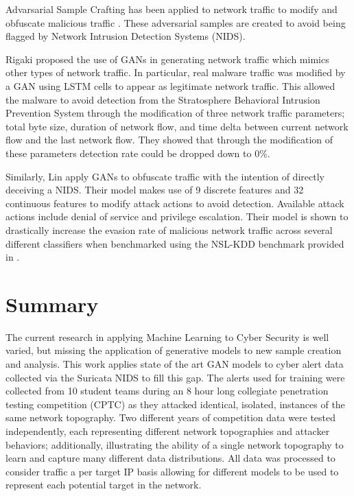 Advarsarial Sample Crafting has been applied to network traffic to modify and obfuscate malicious traffic \cite{Rigaki2018, Lin2018, Hu2017, Anderson2017}. These adversarial samples are created to avoid being flagged by Network Intrusion Detection Systems (NIDS).

Rigaki \etal \cite{Rigaki2018} proposed the use of GANs in generating network traffic which mimics other types of network traffic. In particular, real malware traffic was modified by a GAN using LSTM cells to appear as legitimate network traffic. This allowed the malware to avoid detection from the Stratosphere Behavioral Intrusion Prevention System through the modification of three network traffic parameters; total byte size, duration of network flow, and time delta between current network flow and the last network flow. They showed that through the modification of these parameters detection rate could be dropped down to 0\%. 

Similarly, Lin \etal \cite{Lin2018} apply GANs to obfuscate traffic with the intention of directly deceiving a NIDS. Their model makes use of 9 discrete features and 32 continuous features to modify attack actions to avoid detection. Available attack actions include denial of service and privilege escalation. Their model is shown to drastically increase the evasion rate of malicious network traffic across several different classifiers when benchmarked using the NSL-KDD benchmark provided in \cite{Hu2015}.

\section{Summary}

The current research in applying Machine Learning to Cyber Security is well varied, but missing the application of generative models to new sample creation and analysis. This work applies state of the art GAN models to cyber alert data collected via the Suricata NIDS to fill this gap. The alerts used for training were collected from 10 student teams during an 8 hour long collegiate penetration testing competition (CPTC) as they attacked identical, isolated, instances of the same network topography. Two different years of competition data were tested independently, each representing different network topographies and attacker behaviors; additionally, illustrating the ability of a single network topography to learn and capture many different data distributions. All data was processed to consider traffic a per target IP basis allowing for different models to be used to represent each potential target in the network. 

